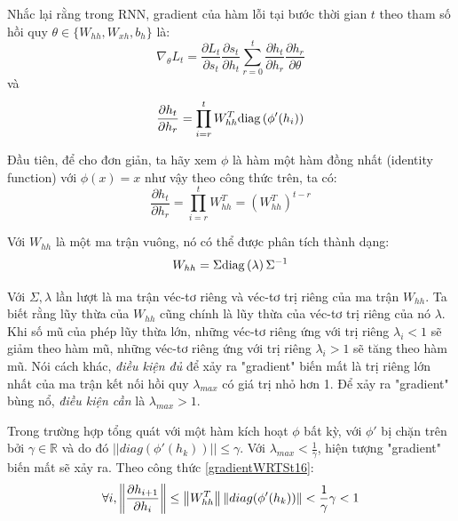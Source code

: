 Nhắc lại rằng trong RNN, gradient của hàm lỗi tại bước thời gian $t$ theo tham số hồi quy $\theta  \in \{W_{hh}, W_{xh}, b_h \}$ là:
\begin{equation} \label{beginGradientVanish0}
	\nabla_{\theta}L_t = \frac{\partial L_t}{\partial s_t} \frac{\partial s_t}{\partial h_t} \sum_{r=0}^{t}  \frac{\partial h_t}{\partial h_r}\frac{\partial h_r}{\partial \theta}
\end{equation}
và 
\begin{equation} \label{beginGradientVanish1}
	\frac{\partial h_t}{\partial h_r} = \prod_{i=r}^{t} W_{hh}^T \mathrm{diag} \left( \phi'(h_i) \right)
\end{equation}

Đầu tiên, để cho đơn giản, ta hãy xem $\phi$ là hàm một hàm đồng nhất (identity function) với $\phi(x) = x$ như vậy theo công thức trên, ta có:
\begin{equation} \label{gradientVanish3}
	\frac{\partial h_t}{\partial h_r} = \prod_{i=r}^{t} W_{hh}^T = \left (W_{hh}^T \right)^{t-r}
\end{equation}

Với $W_{hh}$ là một ma trận vuông, nó có thể được phân tích thành dạng:
\begin{equation} \label{gradientVanish4}
	W_{hh} = \Sigma \mathrm{diag} \left(\lambda \right) \Sigma^{-1} 
\end{equation}

Với $\Sigma, \lambda$ lần lượt là ma trận véc-tơ riêng và véc-tơ trị riêng của ma trận $W_{hh}$. Ta biết rằng lũy thừa của $W_{hh}$ cũng chính là lũy thừa của véc-tơ trị riêng của nó $\lambda$. Khi số mũ của phép lũy thừa lớn, những véc-tơ riêng ứng với trị riêng $\lambda_i < 1$ sẽ giảm theo hàm mũ, những véc-tơ riêng ứng với trị riêng $\lambda_i > 1$ sẽ tăng theo hàm mũ. Nói cách khác, \textit{điều kiện đủ} để xảy ra "gradient" biến mất là trị riêng lớn nhất của ma trận kết nối hồi quy $\lambda_{max}$ có giá trị nhỏ hơn 1. Để xảy ra "gradient" bùng nổ, \textit{điều kiện cần} là $\lambda_{max} > 1$.

Trong trường hợp tổng quát với một hàm kích hoạt $\phi$ bất kỳ, với $\phi'$ bị chặn trên bởi $\gamma \in \mathbb{R}$ và do đó $||diag(\phi'(h_k))|| \leq \gamma$. Với $\lambda_{max} < \frac{1}{\gamma}$, hiện tượng "gradient" biến mất sẽ xảy ra. Theo công thức \ref{gradientWRTSt16}:
\begin{equation} \label{gradientVanish5}
	\forall i, \left\lVert\frac{\partial h_{i+1}}{\partial h_{i}}\right\rVert \leq \left\lVert W^T_{hh} \right\rVert \left\lVert diag(\phi'(h_k)) \right\rVert < \frac{1}{\gamma} \gamma < 1 
\end{equation}

